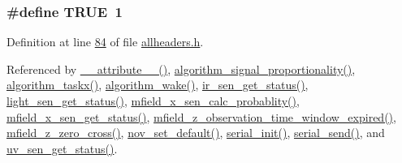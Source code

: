 \hypertarget{a00040_aa8cecfc5c5c054d2875c03e77b7be15d}{
\subsubsection[{T\+R\+U\+E}]{\setlength{\rightskip}{0pt plus 5cm}\#define T\+R\+U\+E~1}}\label{a00040_aa8cecfc5c5c054d2875c03e77b7be15d}


Definition at line \hyperlink{a00040_source_l00084}{84} of file \hyperlink{a00040_source}{allheaders.\+h}.



Referenced by \hyperlink{a00041_source_l00025}{\+\_\+\+\_\+attribute\+\_\+\+\_\+()}, \hyperlink{a00038_source_l00242}{algorithm\+\_\+signal\+\_\+proportionality()}, \hyperlink{a00038_source_l01905}{algorithm\+\_\+taskx()}, \hyperlink{a00038_source_l00670}{algorithm\+\_\+wake()}, \hyperlink{a00045_source_l00302}{ir\+\_\+sen\+\_\+get\+\_\+status()}, \hyperlink{a00047_source_l00204}{light\+\_\+sen\+\_\+get\+\_\+status()}, \hyperlink{a00052_source_l00242}{mfield\+\_\+x\+\_\+sen\+\_\+calc\+\_\+probablity()}, \hyperlink{a00050_source_l00276}{mfield\+\_\+x\+\_\+sen\+\_\+get\+\_\+status()}, \hyperlink{a00053_source_l00241}{mfield\+\_\+z\+\_\+observation\+\_\+time\+\_\+window\+\_\+expired()}, \hyperlink{a00053_source_l00203}{mfield\+\_\+z\+\_\+zero\+\_\+cross()}, \hyperlink{a00060_source_l00760}{nov\+\_\+set\+\_\+default()}, \hyperlink{a00030_source_l00159}{serial\+\_\+init()}, \hyperlink{a00030_source_l00577}{serial\+\_\+send()}, and \hyperlink{a00073_source_l00302}{uv\+\_\+sen\+\_\+get\+\_\+status()}.

